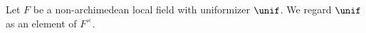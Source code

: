 Let $F$ be a non-archimedean local field with uniformizer $\unif$. We regard $\unif$ as an element of $F^\times$.
